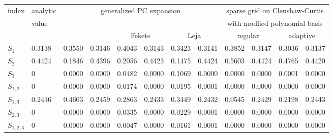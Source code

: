 
\begin{table}[!ht]
  \fontsize{8pt}{3ex}\selectfont
  \renewcommand{\arraystretch}{1.2}
  \begin{tabularx}{\textwidth}{XXXXXXXXXXXX}
    \toprule
    index &
    analytic &
    \multicolumn{6}{c}{generalized PC expansion} &
    \multicolumn{4}{c}{sparse grid on Clenshaw-Curtis} \\
    &
    value &
    & & & & & &
    \multicolumn{4}{c}{with modfied polynomial basis} \\
    \hline
    & &
    \multicolumn{2}{c}{\citet{Sudret08Global}} &
    \multicolumn{2}{c}{Fekete} &
    \multicolumn{2}{c}{Leja} &
    \multicolumn{2}{c}{regular} &
    \multicolumn{2}{c}{adaptive} \\
    \toprule
    $S_1$ & 0.3138 & 0.3550 & 0.3146 & 0.4043 & 0.3143 & 0.3423 & 0.3141 & 0.3852 & 0.3147 & 0.3036 & 0.3137 \\
    $S_2$ & 0.4424 & 0.1846 & 0.4396 & 0.2056 & 0.4423 & 0.1475 & 0.4424 & 0.5603 & 0.4424 & 0.4765 & 0.4420 \\
    $S_3$ & 0 & 0.0000 & 0.0000 & 0.0482 & 0.0000 & 0.1069 & 0.0000 & 0.0000 & 0.0000 & 0.0001 & 0.0000 \\
    $S_{1, 2}$ & 0 & 0.0000 & 0.0000 & 0.0174 & 0.0000 & 0.0195 & 0.0001 & 0.0000 & 0.0000 & 0.0000 & 0.0000 \\
    $S_{1, 3}$ & 0.2436 & 0.4603 & 0.2459 & 0.2863 & 0.2433 & 0.3449 & 0.2432 & 0.0545 & 0.2429 & 0.2198 & 0.2443 \\
    $S_{2, 3}$ & 0 & 0.0000 & 0.0000 & 0.0335 & 0.0000 & 0.0229 & 0.0001 & 0.0000 & 0.0000 & 0.0000 & 0.0000 \\
    $S_{1, 2, 3}$ & 0 & 0.0000 & 0.0000 & 0.0047 & 0.0000 & 0.0161 & 0.0001 & 0.0000 & 0.0000 & 0.0000 & 0.0000 \\
    \hline
    

\end{tabularx}
\end{table}
